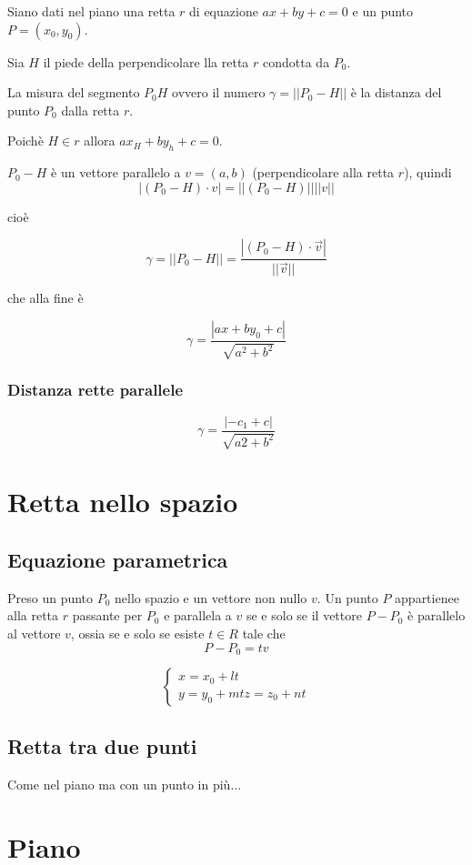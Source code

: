 Siano dati nel piano una retta $r$ di equazione $ax+by+c=0$ e un punto $P = (x_0,y_0)$.

Sia $H$ il piede della perpendicolare lla retta $r$ condotta da $P_0$.

La misura del segmento $P_0H$ ovvero il numero $\gamma = ||P_0-H||$ è la distanza del punto $P_0$ dalla retta $r$.

Poichè $H \in r$ allora $ax_H+by_h+c=0$.

$P_0-H$ è un vettore parallelo a $v=(a,b)$ (perpendicolare alla retta $r$), quindi $$|(P_0-H) \cdot v| = ||(P_0-H)||||v||$$

cioè

$$\gamma = ||P_0-H|| = \frac{|(P_0-H)\cdot \vec{v}|}{||\vec{v}||}$$

che alla fine è

$$\gamma = \frac{|ax+by_0+c|}{\sqrt{a^2+b^2}}$$

\subsubsection{Distanza rette parallele}

$$\gamma = \frac{|-c_1 + c|}{\sqrt{a2+b^2}}$$

\section{Retta nello spazio}

\subsection{Equazione parametrica}

Preso un punto $P_0$ nello spazio  e un vettore non nullo $v$. Un punto $P$ appartienee alla retta $r$ passante per $P_0$ e parallela a $v$ se e solo se il vettore $P-P_0$ è parallelo al vettore $v$, ossia se e solo se esiste $t \in R$ tale che $$P-P_0=tv$$

$$
\begin{cases}
x = x_0 + lt \\
y = y_0 + mt
z = z_0 + nt
\end{cases}
$$

\subsection{Retta tra due punti}

Come nel piano ma con un punto in più$\ldots$

\section{Piano}


